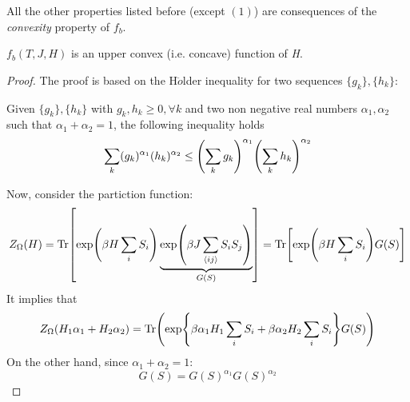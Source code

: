 \documentclass[../main/main.tex]{subfiles}
\begin{document}
All the other properties listed before (except \( (1) \)) are consequences of the \emph{convexity} property of \( f_b \).
\begin{orangebox}
  \begin{theorem}[]
  \( f_b  (T,J,H)\) is an upper convex (i.e. concave) function of \emph{H}.
  \end{theorem}
\end{orangebox}
\begin{proof}
The proof is based on the H$\ddot{o}$lder inequality for two sequences  \( \{ g_k \}, \{ h_k \}     \):
\begin{bluebox}
  \begin{definition}
    Given  \( \{ g_k \}, \{ h_k \}     \) with \( g_k,h_k \ge 0, \forall k \) and two non negative real numbers \( \alpha _1, \alpha _2 \) such that \( \alpha _1 + \alpha _2 =1 \), the following inequality holds
    \begin{equation}
      \sum_{k}^{} (g_k)^{\alpha _1} (h_k)^{\alpha _2} \le \qty(\sum_{k}^{} g_k )^{\alpha _1} \qty(\sum_{k}^{} h_k )^{\alpha _2}
    \end{equation}
  \end{definition}
\end{bluebox}
Now, consider the partiction function:
\begin{equation}
  Z_ \Omega  (H) = \Tr[\exp (\beta H \sum_{i}^{} S_i ) \underbrace{\exp (\beta J \sum_{\expval{ij} }^{} S_i S_j ) }_{G (S)}  ] = \Tr [\exp (\beta H \sum_{i}^{} S_i ) G (S)]
\end{equation}
It implies that
\begin{equation}
  Z_ \Omega  (H_1 \alpha _1 + H_2 \alpha _2) = \Tr(\exp {\beta \alpha _1 H_1 \sum_{i}^{} S_i + \beta \alpha _2 H_2 \sum_{i}^{} S_i} G(S))
\end{equation}
On the other hand, since \( \alpha _1 + \alpha _2 =1 \):
\begin{equation}
  G (S) = G (S)^{\alpha _1} G(S)^{\alpha _2}
\end{equation}


\end{proof}
\end{document}
